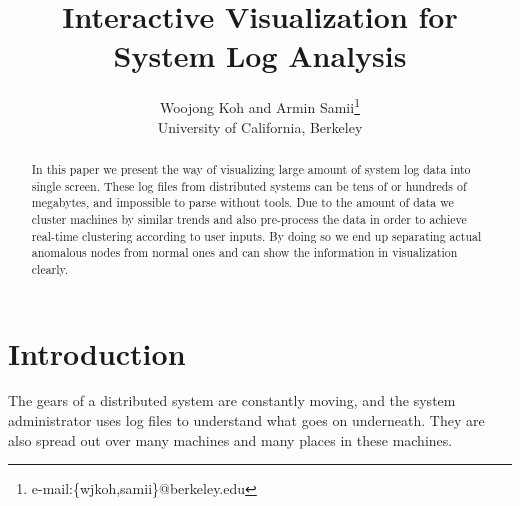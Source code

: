 \documentclass[conference]{acmsiggraph}
\title{Interactive Visualization for System Log Analysis}
\author{Woojong Koh and Armin Samii\thanks{e-mail:\{wjkoh,samii\}@berkeley.edu}\\University of California, Berkeley}
\begin{document}

\maketitle

\begin{abstract}

In this paper we present the way of visualizing large amount of system log data into single screen.
These log files from distributed systems can be tens of or hundreds of megabytes, and impossible to
parse without tools. Due to the amount of data we cluster machines by similar trends and also
pre-process the data in order to achieve real-time clustering according to user inputs. By doing so
we end up separating actual anomalous nodes from normal ones and can show the information in
visualization clearly.

\end{abstract}

\begin{CRcatlist}
\end{CRcatlist}

\keywordlist


\TOGlinkslist


\copyrightspace

\section{Introduction}

The gears of a distributed system are constantly moving, and the system administrator uses log files
to understand what goes on underneath. They are also spread out over many machines and many places in
these machines.
\end{document}
